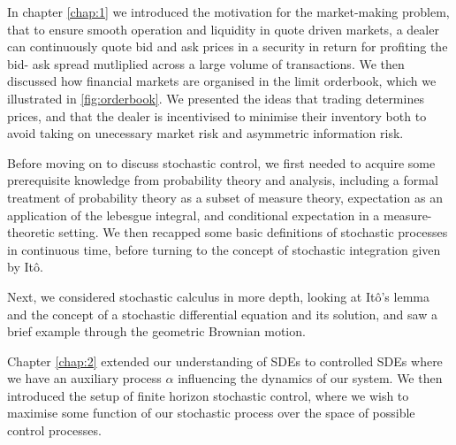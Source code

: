

In chapter \ref{chap:1} we introduced the motivation for the market-making problem,
that to ensure smooth operation and liquidity in quote driven markets, a dealer can 
continuously quote bid and ask prices in a security in return for profiting the bid-
ask spread mutliplied across a large volume of transactions. We then discussed how 
financial markets are organised in the limit orderbook, which we illustrated in 
\ref{fig:orderbook}. We presented the ideas that trading determines prices, and that 
the dealer is incentivised to minimise their inventory both to avoid taking on 
unecessary market risk and asymmetric information risk.

Before moving on to discuss stochastic control, we first needed to acquire some 
prerequisite knowledge from probability theory and analysis, including a formal 
treatment of probability theory as a subset of measure theory, expectation as an
application of the lebesgue integral, and conditional expectation in a measure-theoretic
setting. We then recapped some basic definitions of stochastic processes in continuous
time, before turning to the concept of stochastic integration given by It\^{o}.

Next, we considered stochastic calculus in more depth, looking at It\^{o}'s lemma 
and the concept of a stochastic differential equation and its solution, and saw a brief 
example through the geometric Brownian motion.

Chapter \ref{chap:2} extended our understanding of SDEs to controlled SDEs where we 
have an auxiliary process $\alpha$ influencing the dynamics of our system. We then 
introduced the setup of finite horizon stochastic control, where we wish to maximise 
some function of our stochastic process over the space of possible control processes.

